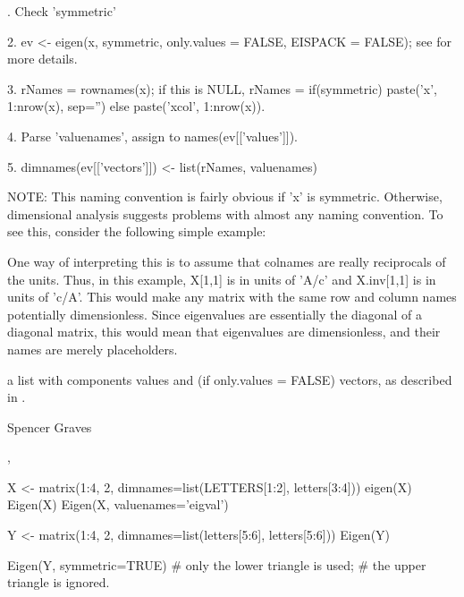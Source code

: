 \documentclass{article}
\begin{document}
\begin{Details}.  Check 'symmetric'  

2.  ev <- eigen(x, symmetric, only.values = FALSE, EISPACK = FALSE);
see  for more details.  

3.  rNames = rownames(x);  if this is NULL, rNames = if(symmetric)
paste('x', 1:nrow(x), sep='') else paste('xcol', 1:nrow(x)).  

4.  Parse 'valuenames', assign to names(ev[['values']]).  

5.  dimnames(ev[['vectors']]) <- list(rNames, valuenames) 

NOTE:  This naming convention is fairly obvious if 'x' is symmetric.
Otherwise, dimensional analysis suggests problems with almost any
naming convention.  To see this, consider the following simple
example:


One way of interpreting this is to assume that colnames are really
reciprocals of the units.  Thus, in this example, X[1,1] is in units
of 'A/c' and X.inv[1,1] is in units of 'c/A'.  This would make any
matrix with the same row and column names potentially dimensionless.
Since eigenvalues are essentially the diagonal of a diagonal matrix,
this would mean that eigenvalues are dimensionless, and their names
are merely placeholders.
\end{Details}
\begin{Value}
a list with components values and (if only.values = FALSE)
vectors, as described in .
\end{Value}
\begin{Author}\relax
Spencer Graves
\end{Author}
\begin{SeeAlso}\relax
{},
\end{SeeAlso}
\begin{Examples}
\begin{ExampleCode}
X <- matrix(1:4, 2, dimnames=list(LETTERS[1:2], letters[3:4]))
eigen(X)
Eigen(X)
Eigen(X, valuenames='eigval')

Y <- matrix(1:4, 2, dimnames=list(letters[5:6], letters[5:6]))
Eigen(Y)

Eigen(Y, symmetric=TRUE)
# only the lower triangle is used;
# the upper triangle is ignored.  
\end{ExampleCode}
\end{Examples}
\end{document}
